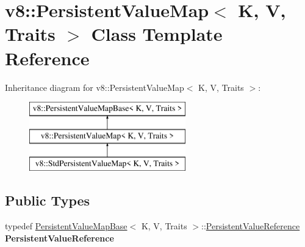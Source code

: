 \hypertarget{classv8_1_1_persistent_value_map}{}\section{v8\+:\+:Persistent\+Value\+Map$<$ K, V, Traits $>$ Class Template Reference}
\label{classv8_1_1_persistent_value_map}
Inheritance diagram for v8\+:\+:Persistent\+Value\+Map$<$ K, V, Traits $>$\+:\begin{figure}[H]
\begin{center}
\leavevmode
\includegraphics[height=3.000000cm]{classv8_1_1_persistent_value_map}
\end{center}
\end{figure}
\subsection*{Public Types}
\begin{DoxyCompactItemize}
\item 
\hypertarget{classv8_1_1_persistent_value_map_a81ed968e13bcef1cd97a09fd024f30f2}{}typedef \hyperlink{classv8_1_1_persistent_value_map_base}{Persistent\+Value\+Map\+Base}$<$ K, V, Traits $>$\+::\hyperlink{classv8_1_1_persistent_value_map_base_1_1_persistent_value_reference}{Persistent\+Value\+Reference} {\bfseries Persistent\+Value\+Reference}\label{classv8_1_1_persistent_value_map_a81ed968e13bcef1cd97a09fd024f30f2}

\end{DoxyCompactItemize}
